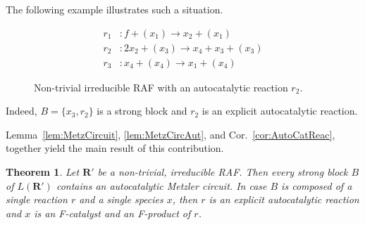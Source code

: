 \documentclass[pdflatex]{sn-jnl}
\theoremstyle{thmstyleone}%
\newtheorem{theorem}{Theorem}%
\theoremstyle{examplesty}%
\theoremstyle{thmstylethree}%
\newcommand{\RAF}[0]{\mathbf{R}'}
\begin{document}
The following example illustrates such a situation. 
\begin{figure}[h]
  \centering
  \begin{minipage}[c]{0.5\textwidth}
    \begin{equation}
      \begin{split}
	r_1&: f + (x_1) \rightarrow x_2 + (x_1) \\
	r_2&: 2x_2 + (x_3) \rightarrow x_4 + x_3 +(x_3) \\
	r_3&: x_4 + (x_4) \rightarrow x_1 + (x_4)
      \end{split}
    \end{equation}
  \end{minipage}%
  \hfill%
  \begin{minipage}[c]{0.5\textwidth}
    \centering
  \end{minipage}
  \caption{Non-trivial irreducible RAF with an autocatalytic reaction
    $r_2$.}
  \label{Fig:ExplAutocatReac}
\end{figure}
\FloatBarrier Indeed, $B=\{x_3, r_2\}$ is a strong block and $r_2$ is an
explicit autocatalytic reaction.

Lemma~\ref{lem:MetzCircuit}, \ref{lem:MetzCircAut}, and
Cor.~\ref{cor:AutoCatReac}, together yield the main result of this
contribution.

\vspace{6pt}
\begin{theorem}
  Let $\RAF$ be a non-trivial, irreducible RAF. Then every strong block $B$
  of $L(\RAF)$ contains an autocatalytic Metzler circuit. In case $B$ is
  composed of a single reaction $r$ and a single species $x$, then $r$ is
  an explicit autocatalytic reaction and $x$ is an F-catalyst and an
  F-product of $r$.
\end{theorem} 
\vspace{6pt}
\end{document}
